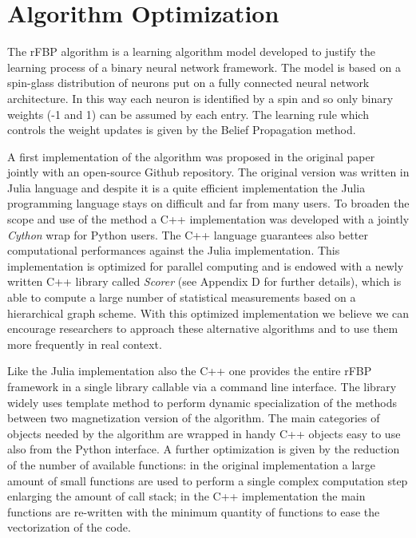 \documentclass{standalone}
\begin{document}
\section[Algorithm Optimization]{Algorithm Optimization}\label{rFBP}

The rFBP algorithm is a learning algorithm model developed to justify the learning process of a binary neural network framework.
The model is based on a spin-glass distribution of neurons put on a fully connected neural network architecture.
In this way each neuron is identified by a spin and so only binary weights (-1 and 1) can be assumed by each entry.
The learning rule which controls the weight updates is given by the Belief Propagation method.

A first implementation of the algorithm was proposed in the original paper~\cite{BaldassiE7655} jointly with an open-source Github repository.
The original version was written in Julia language and despite it is a quite efficient implementation the Julia programming language stays on difficult and far from many users.
To broaden the scope and use of the method a C++ implementation was developed with a jointly \emph{Cython} wrap for Python users.
The C++ language guarantees also better computational performances against the Julia implementation.
This implementation is optimized for parallel computing and is endowed with a newly written C++ library called \emph{Scorer} (see Appendix D for further details), which is able to compute a large number of statistical measurements based on a hierarchical graph scheme.
With this optimized implementation we believe we can encourage researchers to approach these alternative algorithms and to use them more frequently in real context.

Like the Julia implementation also the C++ one provides the entire rFBP framework in a single library callable via a command line interface.
The library widely uses template method to perform dynamic specialization of the methods between two magnetization version of the algorithm.
The main categories of objects needed by the algorithm are wrapped in handy C++ objects easy to use also from the Python interface.
A further optimization is given by the reduction of the number of available functions: in the original implementation a large amount of small functions are used to perform a single complex computation step enlarging the amount of call stack; in the C++ implementation the main functions are re-written with the minimum quantity of functions to ease the vectorization of the code.
\end{document}
